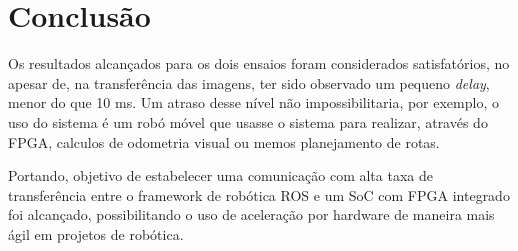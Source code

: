 \chapter{Conclusão}\label{cap:conclusao}

Os resultados alcançados para os dois ensaios foram considerados satisfatórios, no apesar de, na transferência das imagens, ter sido observado um pequeno \textit{delay}, menor do que 10 ms. Um atraso desse nível não impossibilitaria, por exemplo, o uso do sistema é um robó móvel que usasse o sistema para realizar, através do FPGA, calculos de odometria visual ou memos planejamento de rotas. 

Portando,  objetivo de estabelecer uma comunicação com alta taxa de transferência entre o framework de robótica ROS e um SoC com FPGA integrado foi alcançado, possibilitando o uso de aceleração por hardware de maneira mais ágil em projetos de robótica.
